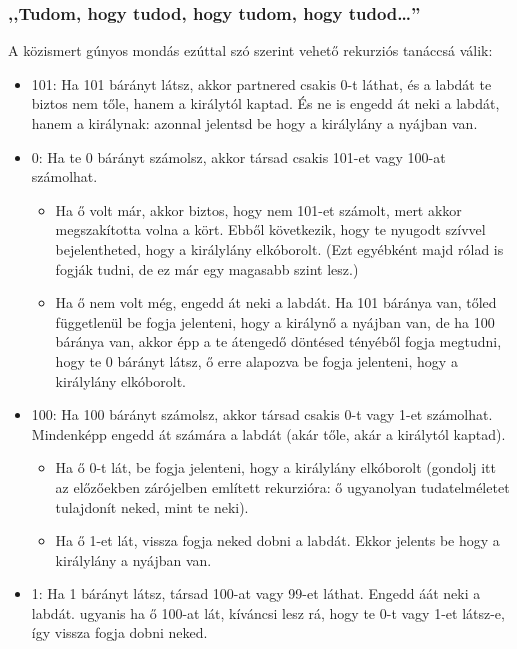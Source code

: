 \documentclass{article}
\begin{document}
	\subsubsection{,,Tudom, hogy tudod, hogy tudom, hogy tudod\dots''}

	A közismert gúnyos mondás ezúttal szó szerint vehető rekurziós tanáccsá válik:

	\begin{itemize}
		\item 101: Ha 101 bárányt látsz, akkor partnered csakis 0-t láthat, és a labdát te biztos nem tőle, hanem a királytól kaptad. És ne is engedd át neki a labdát, hanem a királynak: azonnal jelentsd be hogy a királylány a nyájban van.
		\item 0: Ha  te 0 bárányt számolsz, akkor társad csakis 101-et vagy 100-at számolhat.
		\begin{itemize}
			\item Ha ő volt már, akkor biztos, hogy nem 101-et számolt, mert akkor megszakította volna a kört. Ebből következik, hogy te nyugodt szívvel bejelentheted, hogy a királylány elkóborolt. (Ezt egyébként majd rólad is  fogják tudni, de ez már egy magasabb szint lesz.)
			\item Ha ő nem volt még, engedd át neki a labdát. Ha 101 báránya van, tőled függetlenül be fogja jelenteni, hogy a királynő a nyájban van, de ha 100 báránya van, akkor  épp a te átengedő döntésed tényéből fogja megtudni, hogy te 0 bárányt látsz, ő erre alapozva be fogja jelenteni, hogy a királylány elkóborolt.
		\end{itemize}
		\item 100: Ha 100 bárányt számolsz, akkor társad csakis 0-t vagy 1-et számolhat. Mindenképp engedd át számára a labdát (akár tőle, akár a királytól kaptad).
		\begin{itemize}
			\item Ha ő 0-t lát, be fogja jelenteni, hogy a királylány elkóborolt (gondolj itt az előzőekben zárójelben említett rekurzióra: ő ugyanolyan tudatelméletet tulajdonít neked, mint te neki).
			\item Ha ő 1-et lát, vissza fogja neked dobni a labdát. Ekkor jelents be hogy a királylány a nyájban van.
		\end{itemize}
		\item 1: Ha 1 bárányt látsz, társad 100-at vagy 99-et láthat. Engedd áát neki a labdát. ugyanis ha ő 100-at lát, kíváncsi lesz rá, hogy te 0-t vagy 1-et látsz-e, így vissza fogja dobni neked.
	\end{itemize}
\end{document}
